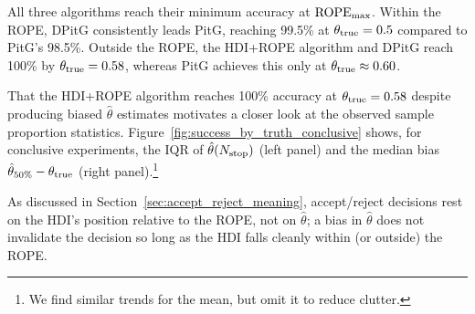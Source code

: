 All three algorithms reach their minimum accuracy at ${\rm ROPE}_{\rm max}$. Within
the ROPE, DPitG consistently leads PitG, reaching 99.5\% at $\theta_{\rm true}=0.5$
compared to PitG's 98.5\%. Outside the ROPE, the HDI+ROPE algorithm and DPitG reach 100\% by
$\theta_{\rm true}=0.58$, whereas PitG achieves this only at
$\theta_{\rm true}\approx 0.60$.

That the HDI+ROPE algorithm reaches 100\% accuracy at $\theta_{\rm true}=0.58$ despite
producing biased $\hat{\theta}$ estimates motivates a closer look at the observed
sample proportion statistics. Figure~\ref{fig:success_by_truth_conclusive} shows, for
conclusive experiments, the IQR of $\hat{\theta}(N_{\rm stop})$ (left panel) and the
median bias $\hat{\theta}_{\rm 50\%}-\theta_{\rm true}$ (right panel).\footnote{We find
similar trends for the mean, but omit it to reduce clutter.}

As discussed in Section~\ref{sec:accept_reject_meaning}, accept/reject decisions rest on
the HDI's position relative to the ROPE, not on $\hat{\theta}$; a bias in $\hat{\theta}$
does not invalidate the decision so long as the HDI falls cleanly within (or outside)
the ROPE.


